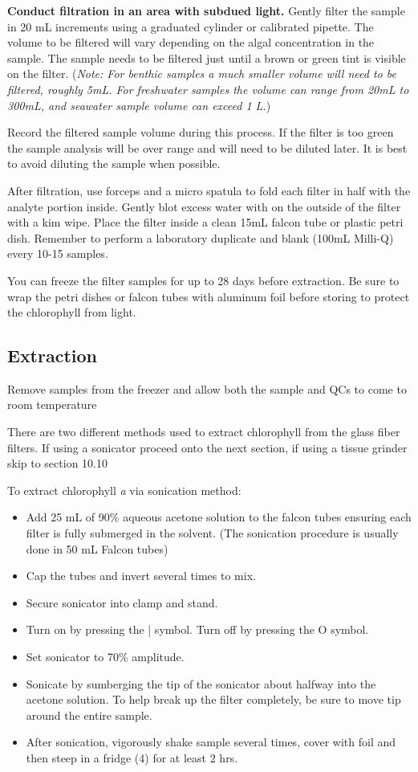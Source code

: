 \documentclass[12pt]{../SOP3}\usepackage[]{graphicx}\usepackage[]{color}
\begin{document}
\NP \textbf{Conduct filtration in an area with subdued light.} Gently filter the sample in 20 mL increments using a graduated cylinder or calibrated pipette. The volume to be filtered will vary depending on the algal concentration in the sample. The sample needs to be filtered just until a brown or green tint is visible on the filter. ({\small \textit{Note: For benthic samples a much smaller volume will need to be filtered, roughly 5mL. For freshwater samples the volume can range from 20mL to 300mL, and seawater sample volume can exceed 1 L.}})

\NP Record the filtered sample volume during this process. If the filter is too green the sample analysis will be over range and will need to be diluted later.  It is best to avoid diluting the sample when possible. 

\NP After filtration, use forceps and a micro spatula to fold each filter in half with the analyte portion inside. Gently blot excess water with on the outside of the filter with a kim wipe. Place the filter inside a clean 15mL falcon tube or plastic petri dish.  
\NP Remember to perform a laboratory duplicate and blank (100mL Milli-Q) every 10-15 samples.

\NP You can freeze the filter samples for up to 28 days before extraction. Be sure to wrap the petri dishes or falcon tubes with aluminum foil before storing to protect the chlorophyll from light. 

\subsection*{Extraction}

\NP Remove samples from the freezer and allow both the sample and QCs to come to room temperature

\NP There are two different methods used to extract chlorophyll from the glass fiber filters. If using a sonicator proceed onto the next section, if using a tissue grinder skip to section 10.10

\NP To extract chlorophyll \textit{a} via sonication method:
\begin{itemize}
\item Add 25 mL of 90\% aqueous acetone solution to the falcon tubes ensuring each filter is fully submerged in the solvent. (The sonication procedure is usually done in 50 mL Falcon tubes)
\item Cap the tubes and invert several times to mix. 
\item Secure sonicator into clamp and stand. 
\item Turn on by pressing the | symbol. Turn off by pressing the O symbol.
\item Set sonicator to 70\% amplitude. 
\item  Sonicate by sumberging the tip of the sonicator about halfway into the acetone solution. To help break up the filter completely, be sure to move tip around the entire sample.
\item After sonication, vigorously shake sample several times, cover with foil and then steep in a fridge (4\celsius) for at least 2 hrs.
\end{itemize}
\end{document}
